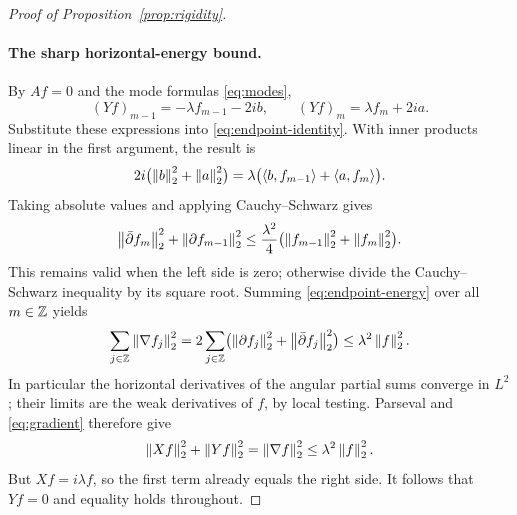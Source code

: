 \begin{proof}[Proof of Proposition~\ref{prop:rigidity}]
\paragraph{The sharp horizontal-energy bound.}
By $Af=0$ and the mode formulas \eqref{eq:modes},
\[
 (Yf)_{m-1}=-\lambda f_{m-1}-2ib,\qquad
 (Yf)_m=\lambda f_m+2ia.
\]
Substitute these expressions into \eqref{eq:endpoint-identity}.
With inner products linear in the first argument, the result is
\[
 2i\bigl(\left\lVert b\right\rVert_2^2+\left\lVert a\right\rVert_2^2\bigr)
 =\lambda\bigl(\left\langle b,f_{m-1}\right\rangle+\left\langle a,f_m\right\rangle\bigr).
\]
Taking absolute values and applying Cauchy--Schwarz gives
\begin{equation}\label{eq:endpoint-energy}
 \left\lVert\bar\partial f_m\right\rVert_2^2+\left\lVert\partial f_{m-1}\right\rVert_2^2
 \le\frac{\lambda^2}{4}
       \bigl(\left\lVert f_{m-1}\right\rVert_2^2+\left\lVert f_m\right\rVert_2^2\bigr).
\end{equation}
This remains valid when the left side is zero; otherwise divide the
Cauchy--Schwarz inequality by its square root.
Summing \eqref{eq:endpoint-energy} over all $m\in\mathbb Z$ yields
\begin{equation}\label{eq:sharp-energy}
 \sum_{j\in\mathbb Z}\left\lVert\nabla f_j\right\rVert_2^2
 =2\sum_{j\in\mathbb Z}
     \bigl(\left\lVert\partial f_j\right\rVert_2^2+\left\lVert\bar\partial f_j\right\rVert_2^2\bigr)
 \le\lambda^2\left\lVert f\right\rVert_2^2.
\end{equation}
In particular the horizontal derivatives of the angular partial sums
converge in $L^2$; their limits are the weak derivatives of $f$, by
local testing.  Parseval and \eqref{eq:gradient} therefore give
\[
 \left\lVert Xf\right\rVert_2^2+\left\lVert Yf\right\rVert_2^2
 =\left\lVert\nabla f\right\rVert_2^2
 \le\lambda^2\left\lVert f\right\rVert_2^2.
\]
But $Xf=i\lambda f$, so the first term already equals the right side.
It follows that $Yf=0$ and equality holds throughout.
\end{proof}
